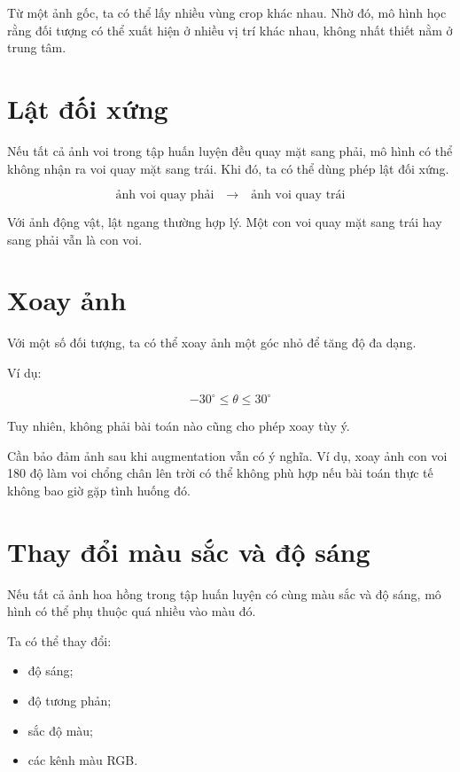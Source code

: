 \documentclass[12pt,a4paper]{report}
\begin{document}
\begin{vidu}
Từ một ảnh gốc, ta có thể lấy nhiều vùng crop khác nhau. Nhờ đó, mô hình học rằng đối tượng có thể xuất hiện ở nhiều vị trí khác nhau, không nhất thiết nằm ở trung tâm.
\end{vidu}

\section{Lật đối xứng}

Nếu tất cả ảnh voi trong tập huấn luyện đều quay mặt sang phải, mô hình có thể không nhận ra voi quay mặt sang trái. Khi đó, ta có thể dùng phép lật đối xứng.

\[
    \text{ảnh voi quay phải}
    \quad \rightarrow \quad
    \text{ảnh voi quay trái}
\]

\begin{vidu}
Với ảnh động vật, lật ngang thường hợp lý. Một con voi quay mặt sang trái hay sang phải vẫn là con voi.
\end{vidu}

\section{Xoay ảnh}

Với một số đối tượng, ta có thể xoay ảnh một góc nhỏ để tăng độ đa dạng.

Ví dụ:

\[
    -30^\circ \leq \theta \leq 30^\circ
\]

Tuy nhiên, không phải bài toán nào cũng cho phép xoay tùy ý.

\begin{luuy}
Cần bảo đảm ảnh sau khi augmentation vẫn có ý nghĩa. Ví dụ, xoay ảnh con voi 180 độ làm voi chổng chân lên trời có thể không phù hợp nếu bài toán thực tế không bao giờ gặp tình huống đó.
\end{luuy}

\section{Thay đổi màu sắc và độ sáng}

Nếu tất cả ảnh hoa hồng trong tập huấn luyện có cùng màu sắc và độ sáng, mô hình có thể phụ thuộc quá nhiều vào màu đó.

Ta có thể thay đổi:

\begin{itemize}
    \item độ sáng;
    \item độ tương phản;
    \item sắc độ màu;
    \item các kênh màu RGB.
\end{itemize}
\end{document}
